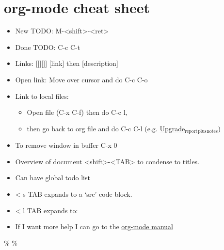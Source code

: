 \documentclass[11pt]{article}
\begin{document}
\section{org-mode cheat sheet}
\label{sec-5}
\begin{itemize}
\item New TODO: M-<shift>-<ret>
\item Done TODO: C-c C-t
\item Links: [[][]] [link] then [description]
\item Open link: Move over cursor and do C-c C-o
\item Link to local files:
\begin{itemize}
\item Open file (C-x C-f) then do C-c l,
\item then go back to org file and do C-c C-l (e.g. \href{file:///home/tigany/Documents/docs/PhDPaperSummary/upgrade_rep_plus_notes.tex}{Upgrade$_{\text{report}}$$_{\text{plus}}$$_{\text{notes}}$})
\end{itemize}
\item To remove window in buffer C-x 0
\item Overview of document <shift>-<TAB> to condense to titles.
\item Can have global todo list
\item < s TAB expands to a ‘src’ code block.
\item < l TAB expands to:
\end{itemize}
\begin{export}
\end{export}


\begin{itemize}
\item If I want more help I can go to the \href{https://orgmode.org/manual/}{org-mode manual}
\end{itemize}




\%
\%
\end{document}
